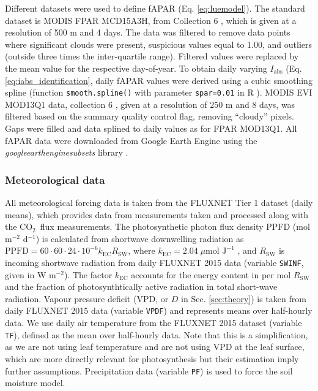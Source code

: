 \documentclass{myreport}
\newcommand{\coo}{CO$_2$}
\begin{document}
Different datasets were used to define fAPAR (Eq. \ref{eq:luemodel}). The standard dataset is MODIS FPAR MCD15A3H, from Collection 6 \citep{modis_fpar_6}, which is given at a resolution of 500 m and 4 days. The data was filtered to remove data points where significant clouds were present, suspicious values equal to 1.00, and outliers (outside three times the inter-quartile range). Filtered values were replaced by the mean value for the respective day-of-year. To obtain daily varying $I_\text{abs}$ (Eq. \ref{eq:iabs_identification}, daily fAPAR values were derived using a cubic smoothing spline (function \texttt{smooth.spline()} with parameter \texttt{spar=0.01} in R \citep{Rcoreteam}). MODIS EVI MOD13Q1 data, collection 6 \citep{modis_evi_6}, given at a resolution of 250 m and 8 days, was filtered based on the summary quality control flag, removing ``cloudy'' pixels. Gaps were filled and data splined to daily values as for FPAR MOD13Q1. All fAPAR data were downloaded from Google Earth Engine using the \textit{google\textunderscore earth\textunderscore engine\textunderscore subsets} library \citep{gee_subset}. 

\subsubsection{Meteorological data}
\label{sec:ppfd}
All meteorological forcing data is taken from the FLUXNET Tier 1 dataset (daily means), which provides data from measurements taken and processed along with the \coo\ flux measurements. The photosynthetic photon flux density PPFD (mol m$^{-2}$ d$^{-1}$) is calculated from shortwave downwelling radiation as $\text{PPFD} = 60 \cdot 60 \cdot 24 \cdot 10^{-6} k_\text{EC} R_{\text{SW}}$, where $k_\text{EC} = 2.04\; \mu \text{mol J}^{-1}$ \citep{meek84}, and $R_{\text{SW}}$ is incoming shortwave radiation from daily FLUXNET 2015 data (variable \texttt{SW\textunderscore IN\textunderscore F}, given in W m$^{-2}$). The factor $k_\text{EC}$ accounts for the energy content in per mol $R_\text{SW}$ and the fraction of photosynthtically active radiation in total short-wave radiation. Vapour pressure deficit (VPD, or $D$ in Sec. \ref{sec:theory}) is taken from daily FLUXNET 2015 data (variable \texttt{VPD\textunderscore F}) and represents means over half-hourly data. We use daily air temperature from the FLUXNET 2015 dataset (variable \texttt{T\textunderscore F}), defined as the mean over half-hourly data. Note that this is a simplification, as we are not using leaf temperature and are not using VPD at the leaf surface, which are more directly relevant for photosynthesis but their estimation imply further assumptions. Precipitation data (variable \texttt{P\textunderscore F}) is used to force the soil moisture model.
\end{document}
